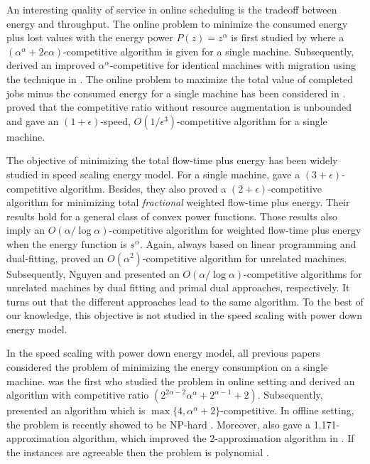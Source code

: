 \documentclass[11pt]{article}
\begin{document}
An interesting quality of service in online scheduling is the tradeoff between 
energy and throughput. The online problem to minimize the consumed energy plus lost values 
with the energy power $P(z) = z^{\alpha}$ is first studied by \cite{ChanLam10:Tradeoff-between}
where a $(\alpha^{\alpha} + 2 e \alpha)$-competitive algorithm is given for a single machine.
Subsequently, \citet{KlingPietrzyk13:Profitable-Scheduling} derived an 
improved $\alpha^{\alpha}$-competitive for identical machines with migration using the technique in 
\cite{GuptaKrishnaswamy12:Online-Primal-Dual}. 
The online problem to maximize the total value of completed jobs minus the consumed energy
for a single machine has been considered in
\cite{PruhsStein10:How-to-Schedule-When}. \citet{PruhsStein10:How-to-Schedule-When} proved that 
the competitive ratio without resource augmentation is unbounded and gave 
an $(1+\epsilon)$-speed, $O(1/\epsilon^{3})$-competitive algorithm for a single machine.
 
The objective of minimizing the total flow-time plus energy has been widely studied in speed scaling energy model. 
For a single machine, \citet{BansalChan09:Speed-scaling}
gave a $(3+\epsilon)$-competitive algorithm. Besides, they also proved a  
$(2+\epsilon)$-competitive algorithm for minimizing total \emph{fractional} weighted flow-time plus
energy. Their results hold for a general class of convex power functions. Those results also 
imply an $O(\alpha/\log \alpha)$-competitive algorithm for weighted flow-time plus energy 
when the energy function is $s^{\alpha}$. Again, always based on linear programming and dual-fitting, 
\citet{AnandGarg12:Resource-augmentation} proved an $O(\alpha^{2})$-competitive algorithm 
for unrelated machines. Subsequently, Nguyen \cite{Thang13:Lagrangian-Duality} and
\citet{DevanurHuang14:Primal-Dual} presented an $O(\alpha/\log \alpha)$-competitive algorithms 
for unrelated machines by dual fitting and primal dual approaches, respectively. It turns out that the different
approaches lead to the same algorithm. To the best of our knowledge, this objective is not studied 
in the speed scaling with power down energy model.

In the speed scaling with power down energy model, all previous papers
considered the problem of minimizing the energy consumption on a single machine. 
\citet{IraniShukla07:Algorithms-for-power} was the first 
who studied the problem in online setting and derived an algorithm with competitive ratio 
$(2^{2\alpha-2}\alpha^{\alpha} + 2^{\alpha-1} + 2)$. Subsequently, 
\citet{HanLam10:Deadline-scheduling} presented an algorithm 
which is $\max\{4,\alpha^{\alpha}+2\}$-competitive.
In offline setting, the problem is recently showed to be NP-hard 
\cite{AlbersAntoniadis12:Race-to-idle:}. Moreover, \citet{AlbersAntoniadis12:Race-to-idle:}
also gave a 1.171-approximation algorithm, which improved
the 2-approximation algorithm in \cite{IraniShukla07:Algorithms-for-power}. 
If the instances are agreeable then the problem is polynomial 
\cite{BampisDurr12:Speed-scaling}.
 
\end{document}
